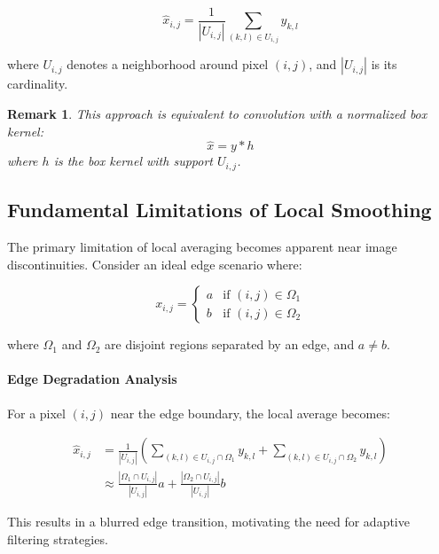 \documentclass[12pt]{article}
\newtheorem{remark}[theorem]{Remark}
\begin{document}
\begin{equation}
    \label{eq:simple_average}
    \hat{x}_{i,j} = \frac{1}{|U_{i,j}|} \sum_{(k,l) \in U_{i,j}} y_{k,l}
\end{equation}

where $U_{i,j}$ denotes a neighborhood around pixel $(i,j)$, and $|U_{i,j}|$ is its cardinality.

\begin{remark}
    This approach is equivalent to convolution with a normalized box kernel:
    \begin{equation}
        \hat{x} = y * h
    \end{equation}
    where $h$ is the box kernel with support $U_{i,j}$.
\end{remark}

\subsection{Fundamental Limitations of Local Smoothing}
\label{subsec:limitations}

The primary limitation of local averaging becomes apparent near image discontinuities. Consider an ideal edge scenario where:

\begin{equation}
    x_{i,j} = \begin{cases}
        a & \text{if } (i,j) \in \Omega_1 \\
        b & \text{if } (i,j) \in \Omega_2
    \end{cases}
\end{equation}

where $\Omega_1$ and $\Omega_2$ are disjoint regions separated by an edge, and $a \neq b$.

\paragraph{Edge Degradation Analysis}
For a pixel $(i,j)$ near the edge boundary, the local average becomes:

\begin{align}
    \hat{x}_{i,j} & = \frac{1}{|U_{i,j}|} \left( \sum_{(k,l) \in U_{i,j} \cap \Omega_1} y_{k,l} + \sum_{(k,l) \in U_{i,j} \cap \Omega_2} y_{k,l} \right) \\
                  & \approx \frac{|\Omega_1 \cap U_{i,j}|}{|U_{i,j}|} a + \frac{|\Omega_2 \cap U_{i,j}|}{|U_{i,j}|} b
\end{align}

This results in a blurred edge transition, motivating the need for adaptive filtering strategies.
\end{document}
